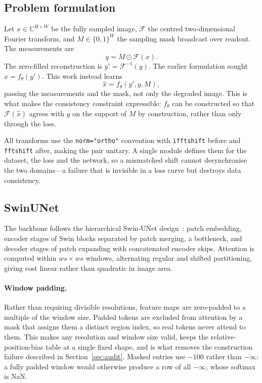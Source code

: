 \documentclass[11pt]{article}
\newcommand{\code}[1]{\texttt{\small #1}}
\begin{document}
\subsection{Problem formulation}

Let $x \in \mathbb{C}^{H\times W}$ be the fully sampled image, $\mathcal{F}$ the
centred two-dimensional Fourier transform, and $M \in \{0,1\}^{W}$ the sampling
mask broadcast over readout. The measurements are
\begin{equation}
y = M \odot \mathcal{F}(x).
\end{equation}
The zero-filled reconstruction is $y' = \mathcal{F}^{-1}(y)$. The earlier
formulation sought $\hat{x} = f_\theta(y')$. This work instead learns
\begin{equation}
\hat{x} = f_\theta(y', y, M),
\end{equation}
passing the measurements and the mask, not only the degraded image. This is what
makes the consistency constraint expressible: $f_\theta$ can be constructed so
that $\mathcal{F}(\hat{x})$ agrees with $y$ on the support of $M$ by
construction, rather than only through the loss.

All transforms use the \code{norm="ortho"} convention with \code{ifftshift}
before and \code{fftshift} after, making the pair unitary. A single module
defines them for the dataset, the loss and the network, so a mismatched shift
cannot desynchronise the two domains---a failure that is invisible in a loss
curve but destroys data consistency.

\subsection{SwinUNet}
\label{sec:swinunet}

The backbone follows the hierarchical Swin-UNet design~\cite{liu2021, cao2021}:
patch embedding, encoder stages of Swin blocks separated by patch merging, a
bottleneck, and decoder stages of patch expanding with concatenated encoder
skips. Attention is computed within $ws \times ws$ windows, alternating regular
and shifted partitioning, giving cost linear rather than quadratic in image
area.

\paragraph{Window padding.} Rather than requiring divisible resolutions, feature
maps are zero-padded to a multiple of the window size. Padded tokens are
excluded from attention by a mask that assigns them a distinct region index, so
real tokens never attend to them. This makes any resolution and window size
valid, keeps the relative-position-bias table at a single fixed shape, and is
what removes the construction failure described in Section~\ref{sec:audit}.
Masked entries use $-100$ rather than $-\infty$: a fully padded window would
otherwise produce a row of all $-\infty$, whose softmax is NaN.
\end{document}
